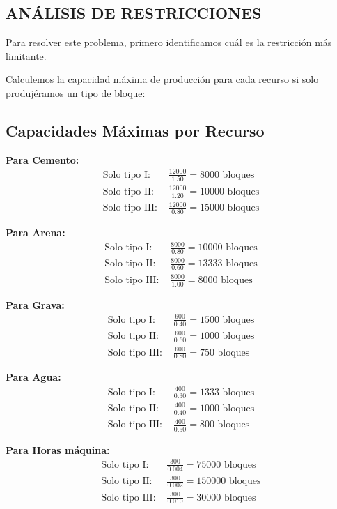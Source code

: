\documentclass[12pt, a4paper, oneside]{book}
\theoremstyle{definition}
\begin{document}
\subsection{ANÁLISIS DE RESTRICCIONES}

Para resolver este problema, primero identificamos cuál es la restricción más limitante.

Calculemos la capacidad máxima de producción para cada recurso si solo produjéramos un tipo de bloque:

\subsection{Capacidades Máximas por Recurso}

\textbf{Para Cemento:}
\begin{align}
\text{Solo tipo I: } &\frac{12000}{1.50} = 8000 \text{ bloques} \\
\text{Solo tipo II: } &\frac{12000}{1.20} = 10000 \text{ bloques} \\
\text{Solo tipo III: } &\frac{12000}{0.80} = 15000 \text{ bloques}
\end{align}

\textbf{Para Arena:}
\begin{align}
\text{Solo tipo I: } &\frac{8000}{0.80} = 10000 \text{ bloques} \\
\text{Solo tipo II: } &\frac{8000}{0.60} = 13333 \text{ bloques} \\
\text{Solo tipo III: } &\frac{8000}{1.00} = 8000 \text{ bloques}
\end{align}

\textbf{Para Grava:}
\begin{align}
\text{Solo tipo I: } &\frac{600}{0.40} = 1500 \text{ bloques} \\
\text{Solo tipo II: } &\frac{600}{0.60} = 1000 \text{ bloques} \\
\text{Solo tipo III: } &\frac{600}{0.80} = 750 \text{ bloques}
\end{align}

\textbf{Para Agua:}
\begin{align}
\text{Solo tipo I: } &\frac{400}{0.30} = 1333 \text{ bloques} \\
\text{Solo tipo II: } &\frac{400}{0.40} = 1000 \text{ bloques} \\
\text{Solo tipo III: } &\frac{400}{0.50} = 800 \text{ bloques}
\end{align}

\textbf{Para Horas máquina:}
\begin{align}
\text{Solo tipo I: } &\frac{300}{0.004} = 75000 \text{ bloques} \\
\text{Solo tipo II: } &\frac{300}{0.002} = 150000 \text{ bloques} \\
\text{Solo tipo III: } &\frac{300}{0.010} = 30000 \text{ bloques}
\end{align}
\end{document}
